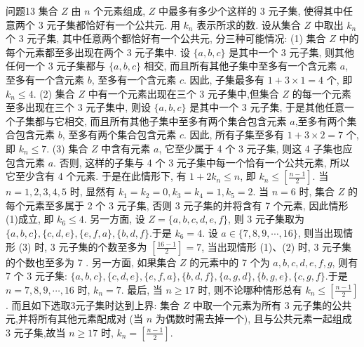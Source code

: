 问题13 集合 $Z$ 由 $n$ 个元素组成, $Z$ 中最多有多少个这样的 3 元子集, 使得其中任意两个 3 元子集都恰好有一个公共元.
用 $k_n$ 表示所求的数.
设从集合 $Z$ 中取出 $k_n$ 个 3 元子集, 其中任意两个都恰好有一个公共元, 分三种可能情况:
(1) 集合 $Z$ 中的每个元素都至多出现在两个 3 元子集中.
设 $\{a, b, c\}$ 是其中一个 3 元子集, 则其他任何一个 3 元子集都与 $\{a, b, c\}$ 相交, 而且所有其他子集中至多有一个含元素 $a$, 至多有一个含元素 $b$, 至多有一个含元素 $c$. 因此, 子集最多有 $1+3 \times 1=4$ 个, 即 $k_n \leqslant 4$.
(2) 集合 $Z$ 中有一个元素出现在三个 3 元子集中,但集合 $Z$ 的每一个元素至多出现在三个 3 元子集中, 则设 $\{a, b, c\}$ 是其中一个 3 元子集, 于是其他任意一个子集都与它相交, 而且所有其他子集中至多有两个集合包含元素 $a$,至多有两个集合包含元素 $b$, 至多有两个集合包含元素 $c$. 因此, 所有子集至多有 $1+3 \times 2=7$ 个, 即 $k_n \leqslant 7$.
(3) 集合 $Z$ 中含有元素 $a$, 它至少属于 4 个 3 元子集, 则这 4 子集也应包含元素 $a$. 否则, 这样的子集与 4 个 3 元子集中每一个恰有一个公共元素, 所以它至少含有 4 个元素.
于是在此情形下, 有 $1+2 k_n \leqslant n$, 即 $k_n \leqslant\left[\frac{n-1}{2}\right]$.
当 $n=1,2,3,4,5$ 时, 显然有 $k_1=k_2=0, k_3=k_4=1, k_5=2$. 当 $n=6$ 时, 集合 $Z$ 的每个元素至多属于 2 个 3 元子集, 否则 3 元子集的并将含有 7 个元素, 因此情形 (1)成立, 即 $k_6 \leqslant 4$. 另一方面, 设 $Z=\{a, b, c, d, e, f\}$, 则 3 元子集取为 $\{a, b, c\},\{c, d, e\},\{e, f, a\},\{b, d, f\}$.于是 $k_6=4$.
设 $a \in\{7,8,9, \cdots, 16\}$, 则当出现情形 (3) 时, 3 元子集的个数至多为 $\left[\frac{16-1}{2}\right]=7$, 当出现情形 (1)、(2) 时, 3 元子集的个数也至多为 7 . 另一方面, 如果集合 $Z$ 的元素中的 7 个为 $a, b, c, d, e, f, g$, 则有 7 个 3 元子集: $\{a, b, c\},\{c, d, e\},\{e, f, a\},\{b, d, f\},\{a, g, d\},\{b, g, e\},\{c, g, f\}$.于是 $n=7,8,9, \cdots, 16$ 时, $k_n=7$.
最后, 当 $n \geqslant 17$ 时, 则不论哪种情形总有 $k_n \leqslant\left[\frac{n-1}{2}\right]$. 而且如下选取3元子集时达到上界: 集合 $Z$ 中取一个元素为所有 3 元子集的公共元,并将所有其他元素配成对 (当 $n$ 为偶数时需去掉一个), 且与公共元素一起组成 3 元子集,故当 $n \geqslant 17$ 时, $k_n=\left[\frac{n-1}{2}\right]$.



